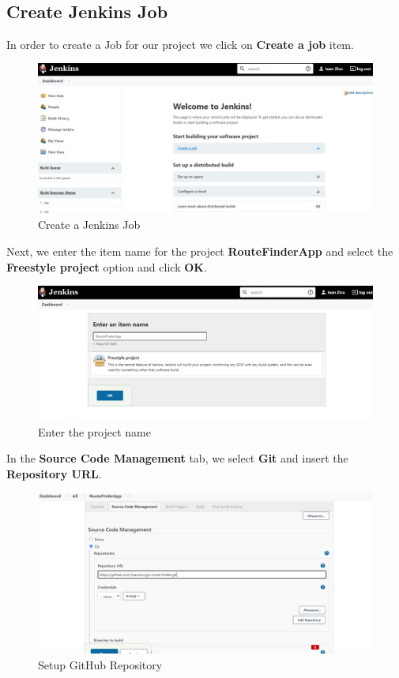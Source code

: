 \documentclass[12pt,a4paper,twoside]{article}
\begin{document}
~\newpage


\subsection{Create Jenkins Job}


In order to create a Job for our project we click on 
\textbf{Create a job} item.


\begin{figure}[H]
    \centering
        \includegraphics[width=15cm]{images-aws/32-jenkins-create-job.png}
        \caption{Create a Jenkins Job}
\end{figure}


Next, we enter the item name for the project \textbf{RouteFinderApp} and select the \textbf{Freestyle project} option and click \textbf{OK}.


\begin{figure}[H]
    \centering
        \includegraphics[width=15cm]{images-aws/33-jenkins-set-project-name.png}
        \caption{Enter the project name}
\end{figure}


In the \textbf{Source Code Management} tab, we select \textbf{Git} and insert the \textbf{Repository URL}.


\begin{figure}[H]
    \centering
        \includegraphics[width=15cm]{images-aws/34-jenkins-setup-repo-no-error.png}
        \caption{Setup GitHub Repository}
\end{figure}
\end{document}
